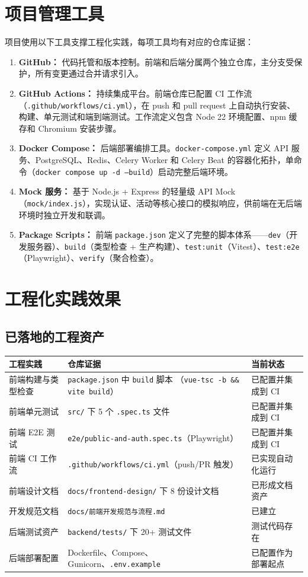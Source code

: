 \documentclass[12pt,a4paper]{ctexart}
\begin{document}
\section{项目管理工具}
项目使用以下工具支撑工程化实践，每项工具均有对应的仓库证据：
\begin{enumerate}
\item \textbf{GitHub：} 代码托管和版本控制。前端和后端分属两个独立仓库，主分支受保护，所有变更通过合并请求引入。
\item \textbf{GitHub Actions：} 持续集成平台。前端仓库已配置 CI 工作流（\texttt{.github/workflows/ci.yml}），在 push 和 pull request 上自动执行安装、构建、单元测试和端到端测试。工作流定义包含 Node 22 环境配置、npm 缓存和 Chromium 安装步骤。
\item \textbf{Docker Compose：} 后端部署编排工具。\texttt{docker-compose.yml} 定义 API 服务、PostgreSQL、Redis、Celery Worker 和 Celery Beat 的容器化拓扑，单命令（\texttt{docker compose up -d --build}）启动完整后端环境。
\item \textbf{Mock 服务：} 基于 Node.js + Express 的轻量级 API Mock（\texttt{mock/index.js}），实现认证、活动等核心接口的模拟响应，供前端在无后端环境时独立开发和联调。
\item \textbf{Package Scripts：} 前端 \texttt{package.json} 定义了完整的脚本体系——\texttt{dev}（开发服务器）、\texttt{build}（类型检查 + 生产构建）、\texttt{test:unit}（Vitest）、\texttt{test:e2e}（Playwright）、\texttt{verify}（聚合检查）。
\end{enumerate}

\section{工程化实践效果}
\subsection{已落地的工程资产}
\noindent\begin{tabularx}{\textwidth}{p{2.5cm}Y p{3cm}}
\toprule 工程实践 & 仓库证据 & 当前状态 \\\midrule
前端构建与类型检查 & \texttt{package.json} 中 \texttt{build} 脚本 \newline（\texttt{vue-tsc -b \&\& vite build}） & 已配置并集成到 CI \\
前端单元测试 & \texttt{src/} 下 5 个 \texttt{.spec.ts} 文件 & 已配置并集成到 CI \\
前端 E2E 测试 & \texttt{e2e/public-and-auth.spec.ts}（Playwright） & 已配置并集成到 CI \\
前端 CI 工作流 & \texttt{.github/workflows/ci.yml}（push/PR 触发） & 已实现自动化运行 \\
前端设计文档 & \texttt{docs/frontend-design/} 下 8 份设计文档 & 已形成文档资产 \\
开发规范文档 & \texttt{docs/前端开发规范与流程.md} & 已建立 \\
后端测试资产 & \texttt{backend/tests/} 下 20+ 测试文件 & 测试代码存在 \\
后端部署配置 & Dockerfile、Compose、Gunicorn、\texttt{.env.example} & 已配置作为部署起点 \\
\bottomrule
\end{tabularx}
\end{document}
